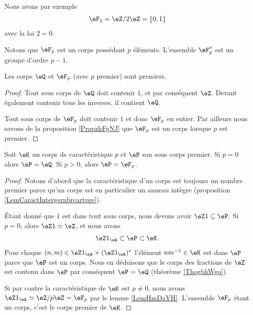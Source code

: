 Nous avons par exemple 
\begin{equation}
    \eF_2=\eZ/2\eZ=\{ 0,1 \}
\end{equation}
avec la loi \( 2=0\).

Notons que \( \eF_p\) est un corps possédant \( p\) éléments. L'ensemble \( \eF_p^*\) est un groupe d'ordre \( p-1\).

\begin{lemma}
    Les corps \( \eQ\) et \( \eF_p\) (avec \( p\) premier) sont premiers.
\end{lemma}

\begin{proof}
    Tout sous corps de \( \eQ\) doit contenir \( 1\), et par conséquent \( \eZ\). Devant également contenir tous les inverses, il contient \( \eQ\).

    Tout sous corps de \(\eF_p \) doit contenir \( 1\) et donc \( \eF_p\) en entier. Par ailleurs nous savons de la proposition \ref{PropzhFgNJ} que \( \eF_p\) est un corps lorsque \( p\) est premier.
\end{proof}

\begin{proposition}
    Soit \( \eK\) un corps de caractéristique \( p\) et \( \eP\) son sous corps premier. Si \( p=0\) alors \( \eP=\eQ\). Si \( p>0\), alors \( \eP=\eF_p\).
\end{proposition}

\begin{proof}
    Notons d'abord que la caractéristique d'un corps est toujours un nombre premier parce qu'un corps est en particulier un anneau intègre (proposition \ref{LemCaractIntergernbrcartpre}).

    Étant donné que \( 1\) est dans tout sous corps, nous devons avoir \( \eZ 1\subseteq \eP\). Si \( p=0\), alors \( \eZ 1\simeq \eZ\), et nous avons
    \begin{equation}
        \eZ 1_{\eA}\subset \eP\subset \eK.
    \end{equation}
    Pour chaque \( (n,m)\in \eZ 1_{\eA}\times (\eZ 1_{\eA})^*\) l'élément \( nm^{-1}\in \eK\) est dans \( \eP\) parce que \( \eP\) est un corps. Nous en déduisons que le corps des fractions de \( \eZ\) est contenu dans \( \eP\) par conséquent \( \eP=\eQ\) (théorème \ref{ThogbhWgo}). 

    Si par contre la caractéristique de \( \eK\) est \( p\neq 0\), nous avons \( \eZ 1_{\eA}\simeq\eZ/p\eZ=\eF_p\) par le lemme \ref{LemHmDaYH}. L'ensemble \( \eF_p\) étant un corps, c'est le corps premier de \( \eK\).
\end{proof}

